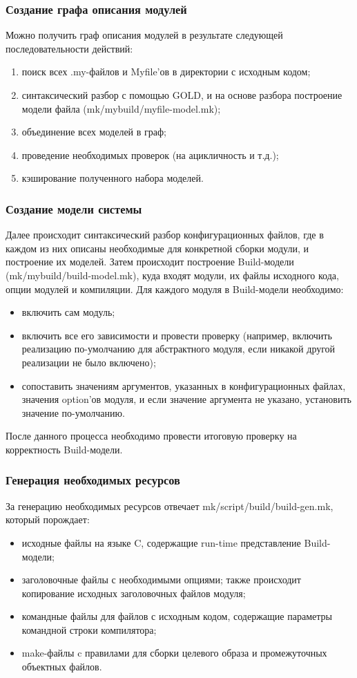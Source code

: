 \subsubsection{Создание графа описания модулей}
Можно получить граф описания модулей в результате следующей последовательности действий:
\begin{enumerate}
	\item поиск всех .my-файлов и Myfile'ов в директории с исходным кодом;
	\item синтаксический разбор с помощью GOLD, и на основе разбора построение модели файла (mk/mybuild/myfile-model.mk);
	\item объединение всех моделей в граф;
	\item проведение необходимых проверок (на ацикличность и т.д.);
	\item кэширование полученного набора моделей.
\end{enumerate}

\subsubsection{Создание модели системы}
Далее происходит синтаксический разбор конфигурационных файлов, где в каждом из них описаны необходимые для конкретной сборки модули, и построение их моделей. Затем происходит построение Build-модели (mk/mybuild/build-model.mk), куда входят модули, их файлы исходного кода, опции модулей и компиляции. Для каждого модуля в Build-модели необходимо:
\begin{itemize}
	\item включить сам модуль;
	\item включить все его зависимости и провести проверку (например, включить реализацию по-умолчанию для абстрактного модуля, если никакой другой реализации не было включено);
	\item сопоставить значениям аргументов, указанных в конфигурационных файлах, значения option'ов модуля, и если значение аргумента не указано, установить значение по-умолчанию.
\end{itemize}
После данного процесса необходимо провести итоговую проверку на корректность Build-модели.
\subsubsection{Генерация необходимых ресурсов}
За генерацию необходимых ресурсов отвечает mk/script/build/build-gen.mk, который порождает:
\begin{itemize}
	\item исходные файлы на языке C, содержащие run-time представление Build-модели;
	\item заголовочные файлы с необходимыми опциями; также происходит копирование исходных заголовочных файлов модуля;
	\item командные файлы для файлов с исходным кодом, содержащие параметры командной строки компилятора;
	\item make-файлы c правилами для сборки целевого образа и промежуточных объектных файлов.
\end{itemize}
